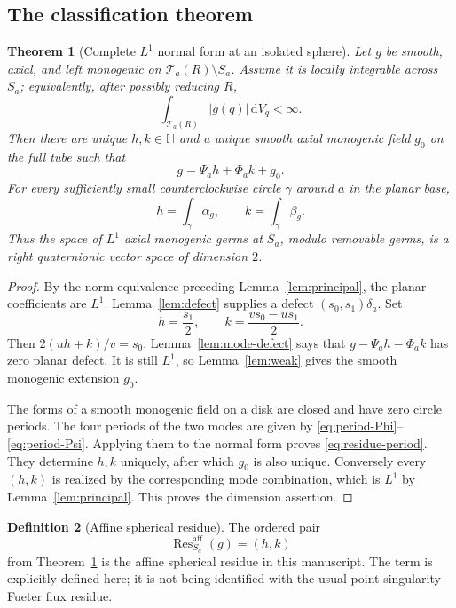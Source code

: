 \documentclass[11pt,a4paper]{article}
\numberwithin{equation}{section}
\newtheorem{theorem}{Theorem}[section]
\theoremstyle{definition}
\newtheorem{definition}[theorem]{Definition}
\theoremstyle{remark}
\newcommand{\HH}{\mathbb H}
\newcommand{\dd}{\,\mathrm d}
\begin{document}
\subsection{The classification theorem}
\begin{theorem}[Complete $L^1$ normal form at an isolated sphere]
\label{thm:L1}
Let $g$ be smooth, axial, and left monogenic on
$\mathcal T_a(R)\setminus S_a$. Assume it is locally integrable across
$S_a$; equivalently, after possibly reducing $R$,
\[
 \int_{\mathcal T_a(R)}|g(q)|\dd V_q<\infty.
\]
Then there are unique $h,k\in\HH$ and a unique smooth axial monogenic
field $g_0$ on the full tube such that
\begin{equation}\label{eq:L1-normal}
 \boxed{\ g=\Psi_a h+\Phi_a k+g_0.\ }
\end{equation}
For every sufficiently small counterclockwise circle $\gamma$ around
$a$ in the planar base,
\begin{equation}\label{eq:residue-period}
 h=\int_\gamma\alpha_g,\qquad k=\int_\gamma\beta_g.
\end{equation}
Thus the space of $L^1$ axial monogenic germs at $S_a$, modulo removable
germs, is a right quaternionic vector space of dimension $2$.
\end{theorem}
\begin{proof}
By the norm equivalence preceding Lemma~\ref{lem:principal}, the planar
coefficients are $L^1$. Lemma~\ref{lem:defect} supplies a defect
$(s_0,s_1)\delta_a$. Set
\begin{equation}\label{eq:source-to-residue}
 h=\frac{s_1}{2},\qquad
 k=\frac{vs_0-us_1}{2}.
\end{equation}
Then $2(uh+k)/v=s_0$. Lemma~\ref{lem:mode-defect} says that
$g-\Psi_a h-\Phi_a k$ has zero planar defect. It is still $L^1$, so
Lemma~\ref{lem:weak} gives the smooth monogenic extension $g_0$.

The forms of a smooth monogenic field on a disk are closed and have
zero circle periods. The four periods of the two modes are given by
\eqref{eq:period-Phi}--\eqref{eq:period-Psi}. Applying them to the
normal form proves \eqref{eq:residue-period}. They determine $h,k$
uniquely, after which $g_0$ is also unique. Conversely every $(h,k)$ is
realized by the corresponding mode combination, which is $L^1$ by
Lemma~\ref{lem:principal}. This proves the dimension assertion.
\end{proof}

\begin{definition}[Affine spherical residue]
The ordered pair
\[
 \operatorname{Res}^{\mathrm{aff}}_{S_a}(g)=(h,k)
\]
from Theorem~\ref{thm:L1} is the affine spherical residue in this
manuscript. The term is explicitly defined here; it is not being
identified with the usual point-singularity Fueter flux residue.
\end{definition}
\end{document}
